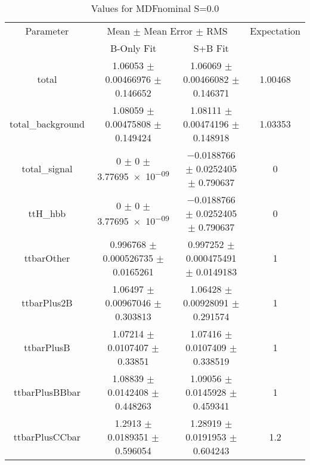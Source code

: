 \begin{table}
\centering
\caption{Values for MDFnominal S=0.0}
\begin{tabular}{cccc}
\toprule
Parameter & \multicolumn{2}{c}{Mean $\pm$ Mean Error $\pm$ RMS} & Expectation\\
 & B-Only Fit & S+B Fit & \\
\midrule
total & \num{1.06053} $\pm$ \num{0.00466976} $\pm$ \num{0.146652} & \num{1.06069} $\pm$ \num{0.00466082} $\pm$ \num{0.146371} & \num{1.00468}\\
total\_background & \num{1.08059} $\pm$ \num{0.00475808} $\pm$ \num{0.149424} & \num{1.08111} $\pm$ \num{0.00474196} $\pm$ \num{0.148918} & \num{1.03353}\\
total\_signal & \num{0} $\pm$ \num{0} $\pm$ \num{3.77695e-09} & \num{-0.0188766} $\pm$ \num{0.0252405} $\pm$ \num{0.790637} & \num{0}\\
ttH\_hbb & \num{0} $\pm$ \num{0} $\pm$ \num{3.77695e-09} & \num{-0.0188766} $\pm$ \num{0.0252405} $\pm$ \num{0.790637} & \num{0}\\
ttbarOther & \num{0.996768} $\pm$ \num{0.000526735} $\pm$ \num{0.0165261} & \num{0.997252} $\pm$ \num{0.000475491} $\pm$ \num{0.0149183} & \num{1}\\
ttbarPlus2B & \num{1.06497} $\pm$ \num{0.00967046} $\pm$ \num{0.303813} & \num{1.06428} $\pm$ \num{0.00928091} $\pm$ \num{0.291574} & \num{1}\\
ttbarPlusB & \num{1.07214} $\pm$ \num{0.0107407} $\pm$ \num{0.33851} & \num{1.07416} $\pm$ \num{0.0107409} $\pm$ \num{0.338519} & \num{1}\\
ttbarPlusBBbar & \num{1.08839} $\pm$ \num{0.0142408} $\pm$ \num{0.448263} & \num{1.09056} $\pm$ \num{0.0145928} $\pm$ \num{0.459341} & \num{1}\\
ttbarPlusCCbar & \num{1.2913} $\pm$ \num{0.0189351} $\pm$ \num{0.596054} & \num{1.28919} $\pm$ \num{0.0191953} $\pm$ \num{0.604243} & \num{1.2}\\
\bottomrule
\end{tabular}
\end{table}